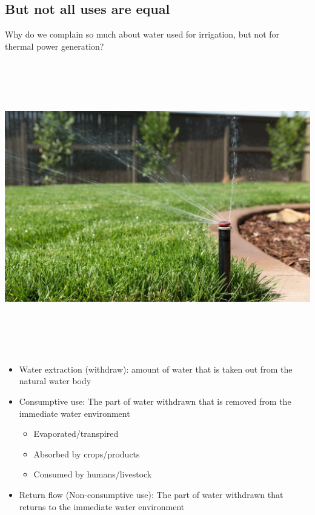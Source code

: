 \documentclass[]{article}
\providecommand{\tightlist}{%
  \setlength{\itemsep}{0pt}\setlength{\parskip}{0pt}}
\begin{document}
\hypertarget{but-not-all-uses-are-equal}{%
\subsection{But not all uses are
equal}\label{but-not-all-uses-are-equal}}

Why do we complain so much about water used for irrigation, but not for
thermal power generation?

\hypertarget{section-25}{%
\subsection{}\label{section-25}}

\includegraphics[width=\textwidth,height=4.6875in]{figures/m10_lawn.jpg}

\hypertarget{section-26}{%
\subsection{}\label{section-26}}

\begin{itemize}
\tightlist
\item
  Water extraction (withdraw): amount of water that is taken out from
  the natural water body
\item
  Consumptive use: The part of water withdrawn that is removed from the
  immediate water environment

  \begin{itemize}
  \tightlist
  \item
    Evaporated/transpired
  \item
    Absorbed by crops/products
  \item
    Consumed by humans/livestock
  \end{itemize}
\item
  Return flow (Non-consumptive use): The part of water withdrawn that
  returns to the immediate water environment
\end{itemize}
\end{document}

